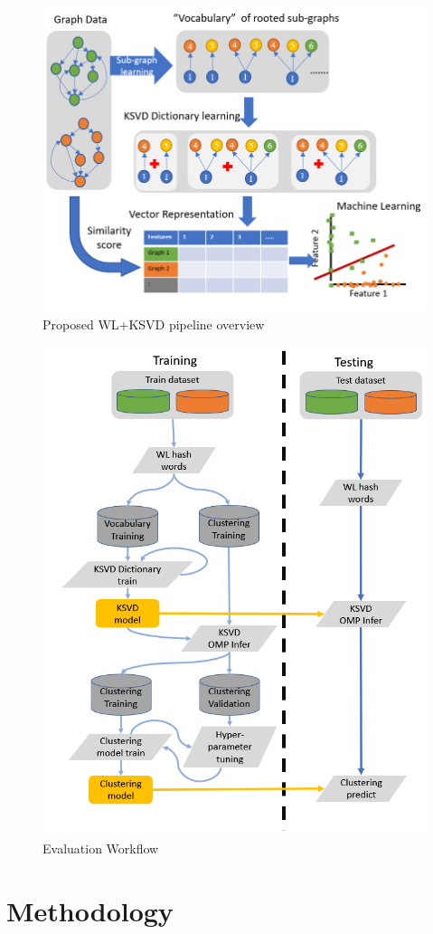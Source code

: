 \begin{figure}[!tbh]
\centerline{\includegraphics[width=0.9\columnwidth]{figures/Graph_embedding/GraphKSVD.png}}
\caption{Proposed WL+KSVD pipeline overview}\label{fig: GKSVD}
\end{figure}

\begin{figure}[!tbh]
\centerline{\includegraphics[width=0.7\columnwidth]{figures/Graph_embedding/Workflow.png}}
\caption{Evaluation Workflow}\label{fig: workflow}
\end{figure}

\section{Methodology}

